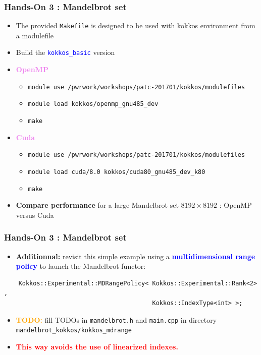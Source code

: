 \begin{frame}[fragile=singleslide]
  \frametitle{Hands-On 3 : Mandelbrot set}

  \begin{itemize}
  \item The provided \texttt{Makefile} is designed to be used with kokkos environment from a modulefile
  \item Build the \textcolor{blue}{\texttt{kokkos\_basic}} version
  \item \textcolor{violet}{\textbf{OpenMP}}
    \begin{itemize}
    \item \texttt{module use /pwrwork/workshops/patc-201701/kokkos/modulefiles}
    \item \texttt{module load kokkos/openmp\_gnu485\_dev}
    \item \texttt{make}
    \end{itemize}
  \item \textcolor{violet}{\textbf{Cuda}}
    \begin{itemize}
    \item \texttt{module use /pwrwork/workshops/patc-201701/kokkos/modulefiles}
    \item \texttt{module load cuda/8.0 kokkos/cuda80\_gnu485\_dev\_k80}
    \item \texttt{make}
    \end{itemize}
  \item \textbf{Compare performance} for a large Mandelbrot set $8192\times 8192$ : OpenMP versus Cuda
  \end{itemize}

\end{frame}
  
\begin{frame}[fragile=singleslide]
  \frametitle{Hands-On 3 : Mandelbrot set}

  \begin{itemize}
  \item {\bf Additionnal:} revisit this simple example using a \textcolor{blue}{\bf multidimensional range policy} to launch the Mandelbrot functor:
  \end{itemize}
  \begin{verbatim}
    Kokkos::Experimental::MDRangePolicy< Kokkos::Experimental::Rank<2> ,
                                         Kokkos::IndexType<int> >;
  \end{verbatim}
  \begin{itemize}
  \item \textcolor{orange}{\textbf{TODO:}} fill TODOs in \texttt{mandelbrot.h} and \texttt{main.cpp} in directory \texttt{mandelbrot\_kokkos/kokkos\_mdrange}
  \item \textcolor{red}{\bf This way avoids the use of linearized indexes.}
  \end{itemize}

\end{frame}

